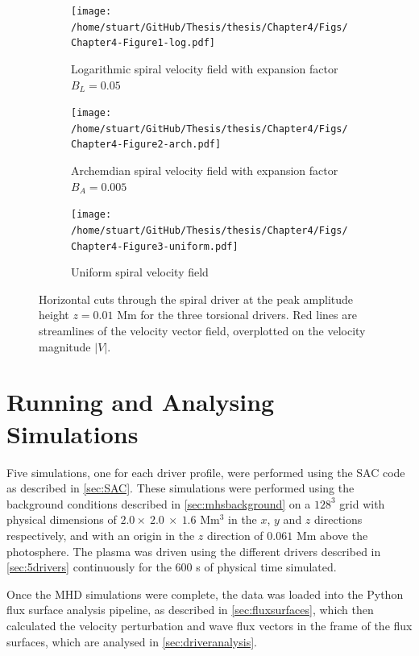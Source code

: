 \documentclass[a4paper,12pt,fourier,authoryear,custommargin]{Classes/PhDThesisPSnPDF}
\begin{document}
\begin{figure}
    \centering


    \begin{subfigure}[b]{0.7\columnwidth}
        \texttt{[image: /home/stuart/GitHub/Thesis/thesis/Chapter4/Figs/Chapter4-Figure1-log.pdf]}
        \caption{Logarithmic spiral velocity field with expansion factor $B_L=0.05$}
        \label{fig:log}
    \end{subfigure}

    \begin{subfigure}[b]{0.7\columnwidth}
        \texttt{[image: /home/stuart/GitHub/Thesis/thesis/Chapter4/Figs/Chapter4-Figure2-arch.pdf]}
        \caption{Archemdian spiral velocity field with expansion factor $B_A=0.005$}
        \label{fig:arch}
    \end{subfigure}

    \begin{subfigure}[b]{0.7\columnwidth}
        \texttt{[image: /home/stuart/GitHub/Thesis/thesis/Chapter4/Figs/Chapter4-Figure3-uniform.pdf]}
        \caption{Uniform spiral velocity field}
        \label{fig:uniform}
    \end{subfigure}
    \caption{Horizontal cuts through the spiral driver at the peak amplitude height $z = 0.01$ Mm for the three torsional drivers. Red lines are streamlines of the velocity vector field, overplotted on the velocity magnitude $|V|$.}
    \label{fig:driver_figs}
\end{figure}

\section{Running and Analysing Simulations}

Five simulations, one for each driver profile, were performed using the SAC code as described in \cref{sec:SAC}.
These simulations were performed using the background conditions described in \cref{sec:mhsbackground} on a $128^3$ grid with physical dimensions of $2.0 \times\ 2.0\ \times\ 1.6$ Mm$^3$ in the $x$, $y$ and $z$ directions respectively, and with an origin in the $z$ direction of $0.061$ Mm above the photosphere.
The plasma was driven using the different drivers described in \cref{sec:5drivers} continuously for the $600$ s of physical time simulated.

Once the MHD simulations were complete, the data was loaded into the Python flux surface analysis pipeline, as described in \cref{sec:fluxsurfaces}, which then calculated the velocity perturbation and wave flux vectors in the frame of the flux surfaces, which are analysed in \cref{sec:driveranalysis}.
\end{document}
